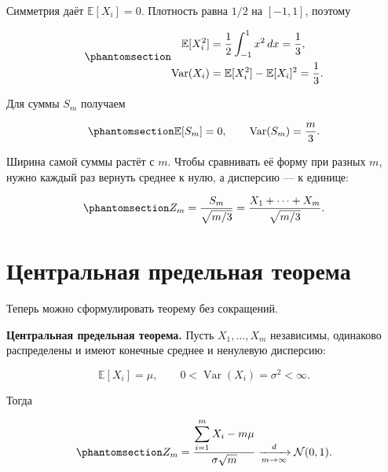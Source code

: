 \documentclass[
  russian,
  11pt,
  a4paper,
  open=any]{scrbook}
\begin{document}
Симметрия даёт \(\mathbb E[X_i]=0\). Плотность равна \(1/2\) на
\([-1,1]\), поэтому

\begin{equation}\protect\phantomsection\label{eq-uniform-summand-moments}{
\begin{aligned}
\mathbb E[X_i^2]
&=\frac12\int_{-1}^{1}x^2\,dx=\frac13,\\
\operatorname{Var}(X_i)
&=\mathbb E[X_i^2]-\mathbb E[X_i]^2=\frac13.
\end{aligned}
}\end{equation}

Для суммы \(S_m\) получаем

\begin{equation}\protect\phantomsection\label{eq-uniform-sum-moments}{
\mathbb E[S_m]=0,
\qquad
\operatorname{Var}(S_m)=\frac m3.
}\end{equation}

Ширина самой суммы растёт с \(m\). Чтобы сравнивать её форму при разных
\(m\), нужно каждый раз вернуть среднее к нулю, а дисперсию --- к
единице:

\begin{equation}\protect\phantomsection\label{eq-uniform-normalized-sum}{
Z_m=\frac{S_m}{\sqrt{m/3}}
=\frac{X_1+\cdots+X_m}{\sqrt{m/3}}.
}\end{equation}

\section{Центральная предельная
теорема}\label{ux446ux435ux43dux442ux440ux430ux43bux44cux43dux430ux44f-ux43fux440ux435ux434ux435ux43bux44cux43dux430ux44f-ux442ux435ux43eux440ux435ux43cux430}

Теперь можно сформулировать теорему без сокращений.

\begin{booknote}

\textbf{Центральная предельная теорема.} Пусть \(X_1,\ldots,X_m\)
независимы, одинаково распределены и имеют конечные среднее и ненулевую
дисперсию:

\[
\mathbb E[X_i]=\mu,
\qquad
0<\operatorname{Var}(X_i)=\sigma^2<\infty.
\]

Тогда

\begin{equation}\protect\phantomsection\label{eq-central-limit-theorem-iid}{
Z_m=
\frac{\displaystyle\sum_{i=1}^{m}X_i-m\mu}
{\sigma\sqrt m}
\xrightarrow[m\to\infty]{d}
\mathcal N(0,1).
}\end{equation}

\end{booknote}
\end{document}
